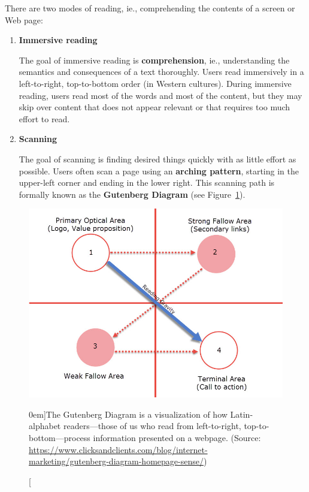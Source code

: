 There are two modes of reading, ie., comprehending the contents of a screen or Web page:
\begin{enumerate}
	\item \textbf{Immersive reading} \par The goal of immersive reading is \textbf{comprehension}, ie., understanding the semantics and consequences of a text thoroughly.
	Users read immersively in a left-to-right, top-to-bottom order (in Western cultures).
	During immersive reading, users read most of the words and most of the content, but they may skip over content that does not appear relevant or that requires too much effort to read.
	
	\item \textbf{Scanning} \par The goal of scanning is finding desired things quickly with as little effort as possible.
	Users often scan a page using an \textbf{arching pattern}, starting in the upper-left corner and ending in the lower right.
	This scanning path is formally known as the \textbf{Gutenberg Diagram} (see Figure~\ref{fig:gutenberg-diagram}).
	
\end{enumerate}

\begin{figure}%
  \includegraphics[width=1.0\textwidth]{../figures/gutenberg-diagram.jpg}
  \caption[][0em]{The Gutenberg Diagram is a visualization of how Latin-alphabet readers---those of us who read from left-to-right, top-to-bottom---process information presented on a webpage. (Source: \url{https://www.clicksandclients.com/blog/internet-marketing/gutenberg-diagram-homepage-sense/})}
  \label{fig:gutenberg-diagram}
\end{figure}

